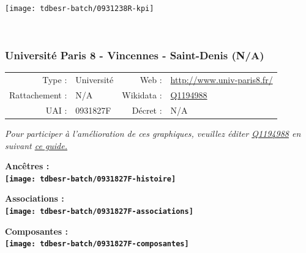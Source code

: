 \documentclass[12pt,french,]{article}
\begin{document}
\begin{center}\texttt{[image: tdbesr-batch/0931238R-kpi]} \end{center}\checkoddpage

\ifoddpage ~\newpage \fi   

\hypertarget{universituxe9-paris-8---vincennes---saint-denis-na}{%
\subsubsection{Université Paris 8 - Vincennes - Saint-Denis
(N/A)}\label{universituxe9-paris-8---vincennes---saint-denis-na}}

\begin{tabular*}{\textwidth}{rp{5cm}rl}  
\hline  
Type : & Université & Web : &\href{http://www.univ-paris8.fr/}{http://www.univ-paris8.fr/} \\  
Rattachement : & N/A & Wikidata : & \href{https://www.wikidata.org/entity/Q1194988}{Q1194988} \\  
UAI : & 0931827F & Décret : & N/A \\  
\hline  
\end{tabular*}

\textit{\scriptsize Pour participer à l'amélioration de ces graphiques, veuillez éditer  \href{https://www.wikidata.org/entity/Q1194988}{Q1194988}  en suivant \href{https://github.com/cpesr/wikidataESR/blob/master/Rmd/wikidataESR.md}{ce guide.}}

\vspace{1cm}  
\begin{minipage}[b]{0.50\textwidth}\begin{center} \bf Ancêtres : \\  
\texttt{[image: tdbesr-batch/0931827F-histoire]} \end{center}\end{minipage}\begin{minipage}[b]{0.50\textwidth}\begin{center} \bf Associations : \\  
\texttt{[image: tdbesr-batch/0931827F-associations]} \end{center}\end{minipage}

\hrulefill

\begin{center} \bf Composantes : \\  
\texttt{[image: tdbesr-batch/0931827F-composantes]} \end{center}
\end{document}

